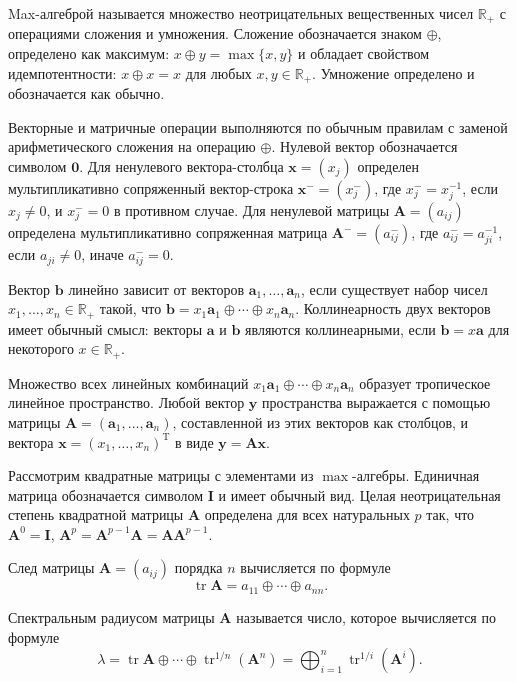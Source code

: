 \documentclass[specialist, substylefile = spbureport.rtx,
               subf,href,colorlinks=true, 12pt]{disser}
\begin{document}
    Max-алгеброй называется множество неотрицательных вещественных чисел $\mathbb{R}_{+}$ с операциями сложения и умножения. Сложение обозначается знаком $\oplus$, определено как максимум: ${x\oplus y=\max\{x,y\}}$ и обладает свойством идемпотентности: ${x\oplus x=x}$ для любых $x,y\in\mathbb{R}_{+}$. Умножение определено и обозначается как обычно.  
            
    Векторные и матричные операции выполняются по обычным правилам с заменой арифметического сложения на операцию $\oplus$. Нулевой вектор обозначается символом $\bm{0}$. Для ненулевого вектора-столбца $\bm{x}=(x_{j})$ определен мультипликативно сопряженный вектор-строка $\bm{x}^{-}=(x_{j}^{-})$, где $x_{j}^{-}=x_{j}^{-1}$, если $x_{j}\ne0$, и $x_{j}^{-}=0$ в противном случае. Для ненулевой матрицы $\bm{A}=(a_{ij})$ определена мультипликативно сопряженная матрица $\bm{A}^{-}=(a_{ij}^{-})$, где $a_{ij}^{-}=a_{ji}^{-1}$, если $a_{ji}\ne0$, иначе $a_{ij}^{-}=0$.

    Вектор $\bm{b}$ линейно зависит от векторов $\bm{a}_{1},\ldots,\bm{a}_{n}$, если существует набор чисел $x_{1},\ldots,x_{n}\in\mathbb{R}_{+}$ такой, что $\bm{b}=x_{1}\bm{a}_{1}\oplus\cdots\oplus x_{n}\bm{a}_{n}$. Коллинеарность двух векторов имеет обычный смысл: векторы $\bm{a}$ и $\bm{b}$ являются коллинеарными, если $\bm{b}=x\bm{a}$ для некоторого $x\in\mathbb{R}_{+}$.

    Множество всех линейных комбинаций $x_{1}\bm{a}_{1}\oplus\cdots\oplus x_{n}\bm{a}_{n}$ образует тропическое линейное пространство. Любой вектор $\bm{y}$ пространства выражается с помощью матрицы $\bm{A}=(\bm{a}_{1},\ldots,\bm{a}_{n})$, составленной из этих векторов как столбцов, и вектора $\bm{x}=(x_{1},\ldots,x_{n})^{\mathrm{T}}$ в виде $\bm{y}=\bm{A}\bm{x}$.

    Рассмотрим квадратные матрицы с элементами из $\max$-алгебры. Единичная матрица обозначается символом $\bm{I}$ и имеет обычный вид. Целая неотрицательная степень квадратной матрицы $\bm{A}$ определена для всех натуральных $p$ так, что $\bm{A}^{0}=\bm{I}$, $\bm{A}^{p}=\bm{A}^{p-1}\bm{A}=\bm{A}\bm{A}^{p-1}$.

    След матрицы $\bm{A}=(a_{ij})$ порядка $n$ вычисляется по формуле 
    $$\mathop\mathrm{tr}\bm{A}=a_{11}\oplus\cdots\oplus a_{nn}.$$

    Спектральным радиусом матрицы $\bm{A}$ называется число, которое вычисляется по формуле
    \begin{equation*}
    \lambda
    =
    \mathop\mathrm{tr}\bm{A}\oplus\cdots\oplus\mathop\mathrm{tr}\nolimits^{1/n}(\bm{A}^{n})
    =
    \bigoplus_{i=1}^{n}{\mathop\mathrm{tr}}^{1/i}(\bm{A}^{i}).
    \end{equation*}
\end{document}
